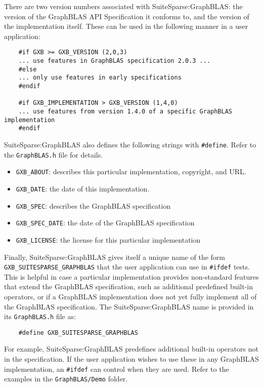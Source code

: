 \documentclass[12pt]{article}
\begin{document}
There are two version numbers associated with SuiteSparse:GraphBLAS:
the version of the GraphBLAS API Specification it
conforms to, and the version of the implementation itself.  These can
be used in the following manner in a user application:

{\footnotesize
\begin{verbatim}
    #if GXB >= GXB_VERSION (2,0,3)
    ... use features in GraphBLAS specification 2.0.3 ...
    #else
    ... only use features in early specifications
    #endif

    #if GXB_IMPLEMENTATION > GXB_VERSION (1,4,0)
    ... use features from version 1.4.0 of a specific GraphBLAS implementation
    #endif \end{verbatim}}


SuiteSparse:GraphBLAS also defines the following strings with \verb'#define'.
Refer to the \verb'GraphBLAS.h' file for details.

\begin{itemize}
\item \verb'GXB_ABOUT': describes this particular implementation,
copyright, and URL.
\item \verb'GXB_DATE': the date of this implementation.
\item \verb'GXB_SPEC': describes the GraphBLAS specification
\item \verb'GXB_SPEC_DATE': the date of the GraphBLAS specification
\item \verb'GXB_LICENSE': the license for this particular implementation
\end{itemize}

Finally, SuiteSparse:GraphBLAS gives itself a unique name of the form
\verb'GXB_SUITESPARSE_GRAPHBLAS' that the user application can use in \verb'#ifdef'
tests. This is helpful in case a particular implementation provides
non-standard features that extend the GraphBLAS specification, such as
additional predefined built-in operators, or if a GraphBLAS implementation does
not yet fully implement all of the GraphBLAS specification.  The
SuiteSparse:GraphBLAS name is provided in its \verb'GraphBLAS.h' file as:

    {\footnotesize
    \begin{verbatim}
    #define GXB_SUITESPARSE_GRAPHBLAS \end{verbatim}}

For example, SuiteSparse:GraphBLAS predefines additional built-in operators not
in the specification.  If the user application wishes to use these in any
GraphBLAS implementation, an \verb'#ifdef' can control when they are used.
Refer to the examples in the \verb'GraphBLAS/Demo' folder.
\end{document}
